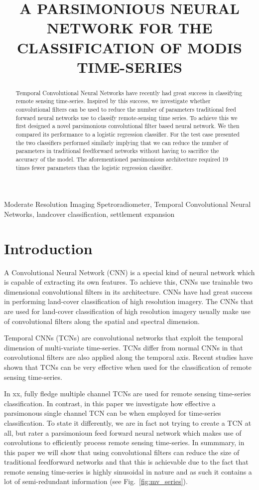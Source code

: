 \documentclass{article}
\title{A PARSIMONIOUS NEURAL NETWORK FOR THE CLASSIFICATION OF MODIS TIME-SERIES}
\begin{document}
%
\maketitle
%
\begin{abstract}
Temporal Convolutional Neural Networks have recently had great success in classifying remote sensing time-series. Inspired by this success, we  investigate whether convolutional filters can be used to reduce the number of parameters traditional feed forward neural networks use to classify remote-sensing time series. To achieve this we first designed a novel parsimonious convolutional filter based neural network. We then compared its performance to a logistic regression classifier. For the test case presented the two classifiers performed similarly implying that we can reduce the number of parameters in traditional feedforward networks without having to sacrifice the accuracy of the model. The aforementioned parsimonious architecture required 19 times fewer parameters than the logistic regression classifier.     
\end{abstract}
%
\begin{keywords}
Moderate Resolution Imaging Spetroradiometer, Temporal Convolutional Neural Networks, landcover classification, settlement expansion
\end{keywords}
%
\section{Introduction}
\label{sec:intro}
A Convolutional Neural Network (CNN) is a special kind of neural network which is capable of extracting its own features. To achieve this, CNNs use trainable two dimensional convolutional filters in its architecture. CNNs have had great success in performing land-cover classification of high resolution imagery. The CNNs that are used for land-cover classification of high resolution imagery usually make use of convolutional filters along the spatial and spectral dimension.

Temporal CNNs (TCNs) are convolutional networks that
exploit the temporal dimension of multi-variate time-series. TCNs differ from normal CNNs in that convolutional filters are also applied along the temporal axis. Recent studies have shown that TCNs can be very effective when used for the classification of remote sensing time-series. 

In xx, fully fledge multiple channel TCNs are used for remote sensing time-series classification. In contrast, in this paper we investigate how effective a parsimonous single channel TCN can be when employed for time-series classification. To state it differently, we are in fact not trying to create a TCN at all, but rater a parsimonioun feed forward neural network which makes use of convolutions to efficiently process remote sensing time-series. In summmary, in this paper we will show that using convolutional filters can reduce the size of traditional feedforward networks and that this is achievable due to the fact that remote sensing time-series is highly sinusoidal in nature and as such it contains a lot of semi-redundant information (see Fig.~\ref{fig:mv_series}). %
\end{document}
